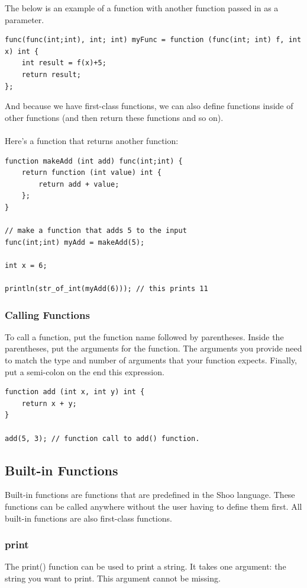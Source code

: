 \documentclass[12pt]{article}
\begin{document}
The below is an example of a function with another function passed in as a parameter.
\begin{lstlisting}
func(func(int;int), int; int) myFunc = function (func(int; int) f, int x) int {
	int result = f(x)+5;
	return result;
};
\end{lstlisting}
And because we have first-class functions, we can also define functions inside of other functions (and then return these functions and so on).
\\ \\
Here's a function that returns another function:
\begin{lstlisting}
function makeAdd (int add) func(int;int) {
	return function (int value) int {
		return add + value;
	};
}

// make a function that adds 5 to the input
func(int;int) myAdd = makeAdd(5);

int x = 6;

println(str_of_int(myAdd(6))); // this prints 11
\end{lstlisting}

\subsubsection{Calling Functions}
To call a function, put the function name followed by parentheses. Inside the parentheses, put the arguments for the function. The arguments you provide need to match the type and number of arguments that your function expects. Finally, put a semi-colon on the end this expression.

\begin{lstlisting}
function add (int x, int y) int {
    return x + y;
}

add(5, 3); // function call to add() function.
\end{lstlisting}

\subsection{Built-in Functions}
Built-in functions are functions that are predefined in the Shoo language. These functions can be called anywhere without the user having to define them first. All built-in functions are also first-class functions.
\subsubsection{print}
The print() function can be used to print a string. It takes one argument: the string you want to print. This argument cannot be missing. \\
\end{document}
